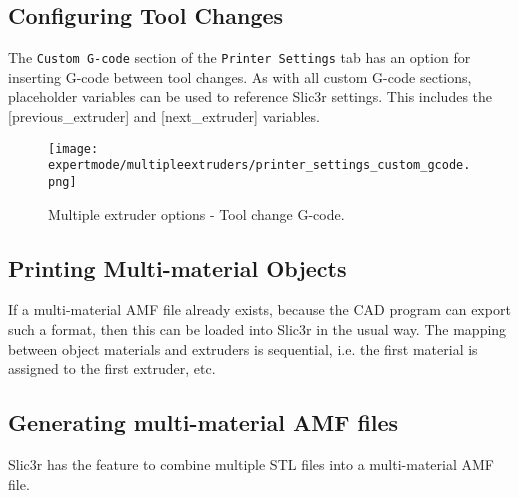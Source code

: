 
\subsection{Configuring Tool Changes} %
\label{sub:configuring_tool_changes}


The \texttt{Custom G-code} section of the \texttt{Printer Settings} tab has an option for inserting G-code between tool changes.  As with all custom G-code sections, placeholder variables can be used to reference Slic3r settings.  This includes the [previous\_extruder] and [next\_extruder] variables.

\begin{figure}[H]
\centering
\texttt{[image: expertmode/multipleextruders/printer\_settings\_custom\_gcode.png]}
\caption{Multiple extruder options - Tool change G-code.}
\label{fig:printer_settings_custom_gcode}
\end{figure}



\subsection{Printing Multi-material Objects} %
\label{sub:printing_multi_material_objects}

If a multi-material AMF file already exists, because the CAD program can export such a format, then this can be loaded into Slic3r in the usual way.  The mapping between object materials and extruders is sequential, i.e. the first material is assigned to the first extruder, etc.



\subsection{Generating multi-material AMF files} %
\label{sub:generating_multi_material_amf_files}

Slic3r has the feature to combine multiple STL files into a multi-material AMF file.


